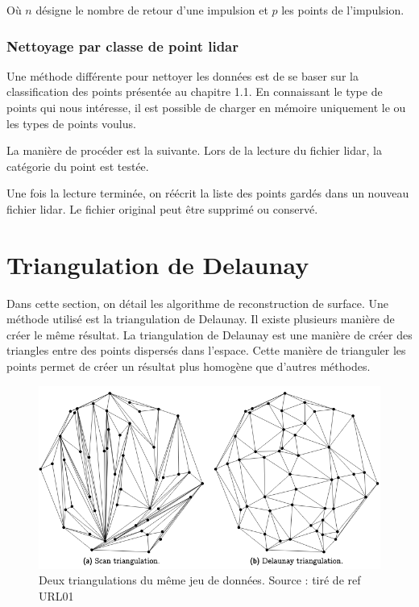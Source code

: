 Où $n$ désigne le nombre de retour d'une impulsion et $p$ les points de l'impulsion.

\subsubsection{Nettoyage par classe de point lidar}

Une méthode différente pour nettoyer les données est de se baser sur la 
classification des points présentée au chapitre 1.1.
En connaissant le type de points qui nous intéresse, il est possible de charger
en mémoire uniquement le ou les types de points voulus. 

La manière de procéder est la suivante.
Lors de la lecture du fichier lidar, la catégorie du point est testée.

Une fois la lecture terminée, on réécrit la liste des points gardés dans un nouveau fichier \gls{lidar}.
Le fichier original peut être supprimé ou conservé.

\section{Triangulation de Delaunay}
Dans cette section, on détail les algorithme de reconstruction de surface.
Une méthode utilisé est la triangulation de Delaunay.
Il existe plusieurs manière de créer le même résultat.
La triangulation de Delaunay est une manière de créer des triangles entre des points dispersés dans l’espace.
Cette manière de trianguler les points permet de créer un résultat plus homogène que d’autres méthodes.

\begin{figure}[htb!]
    \centering
    \includegraphics[width=0.8\linewidth]{figures/triangulation-example.png}
    \caption{Deux triangulations du même jeu de données. Source : tiré de ref URL01}
    \label{fig:triangulation_example}
\end{figure}

